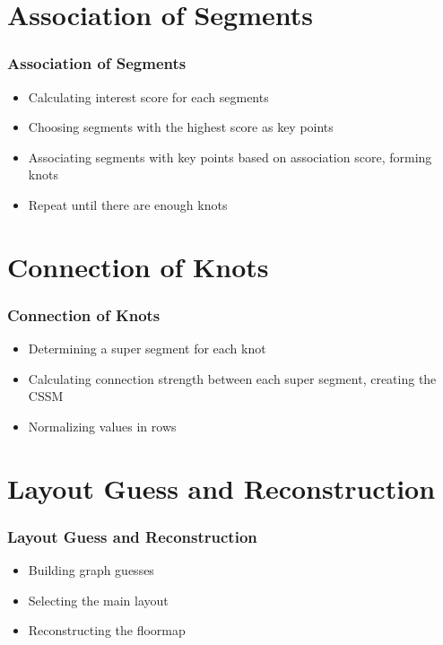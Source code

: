 \documentclass{beamer}
\begin{document}
\section{Association of Segments}
\begin{frame}
\frametitle{Association of Segments}
\begin{itemize}
    \item Calculating interest score for each segments
    \item Choosing segments with the highest score as key points
    \item Associating segments with key points based on association score, forming knots
    \item Repeat until there are enough knots
\end{itemize}
\end{frame}

\section{Connection of Knots}
\begin{frame}
\frametitle{Connection of Knots}
\begin{itemize}
    \item Determining a super segment for each knot
    \item Calculating connection strength between each super segment, creating the CSSM
    \item Normalizing values in rows
\end{itemize}
\end{frame}

\section{Layout Guess and Reconstruction}
\begin{frame}
\frametitle{Layout Guess and Reconstruction}
\begin{itemize}
    \item Building graph guesses
    \item Selecting the main layout
    \item Reconstructing the floormap
\end{itemize}
\end{frame}
\end{document}
